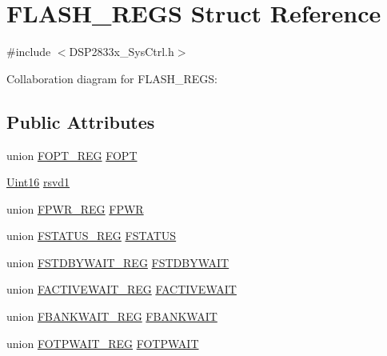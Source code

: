 \hypertarget{struct_f_l_a_s_h___r_e_g_s}{}\section{F\+L\+A\+S\+H\+\_\+\+R\+E\+G\+S Struct Reference}
\label{struct_f_l_a_s_h___r_e_g_s}


{\ttfamily \#include $<$D\+S\+P2833x\+\_\+\+Sys\+Ctrl.\+h$>$}



Collaboration diagram for F\+L\+A\+S\+H\+\_\+\+R\+E\+G\+S\+:
\subsection*{Public Attributes}
\begin{DoxyCompactItemize}
\item 
union \hyperlink{union_f_o_p_t___r_e_g}{F\+O\+P\+T\+\_\+\+R\+E\+G} \hyperlink{struct_f_l_a_s_h___r_e_g_s_a4e3737164105da516d12cf96d72e4462}{F\+O\+P\+T}
\item 
\hyperlink{_d_s_p2833x___device_8h_a59a9f6be4562c327cbfb4f7e8e18f08b}{Uint16} \hyperlink{struct_f_l_a_s_h___r_e_g_s_a908f202dcf45f912317192cf9217cc37}{rsvd1}
\item 
union \hyperlink{union_f_p_w_r___r_e_g}{F\+P\+W\+R\+\_\+\+R\+E\+G} \hyperlink{struct_f_l_a_s_h___r_e_g_s_a08947a9a22155823234bd3697acfa82c}{F\+P\+W\+R}
\item 
union \hyperlink{union_f_s_t_a_t_u_s___r_e_g}{F\+S\+T\+A\+T\+U\+S\+\_\+\+R\+E\+G} \hyperlink{struct_f_l_a_s_h___r_e_g_s_a6cab5a44e4b47f9a71c97561a6fd904b}{F\+S\+T\+A\+T\+U\+S}
\item 
union \hyperlink{union_f_s_t_d_b_y_w_a_i_t___r_e_g}{F\+S\+T\+D\+B\+Y\+W\+A\+I\+T\+\_\+\+R\+E\+G} \hyperlink{struct_f_l_a_s_h___r_e_g_s_ac70507eabc1bf0e5539c4add4b93aed9}{F\+S\+T\+D\+B\+Y\+W\+A\+I\+T}
\item 
union \hyperlink{union_f_a_c_t_i_v_e_w_a_i_t___r_e_g}{F\+A\+C\+T\+I\+V\+E\+W\+A\+I\+T\+\_\+\+R\+E\+G} \hyperlink{struct_f_l_a_s_h___r_e_g_s_a40e915f21d965b80013e0001d1b1c655}{F\+A\+C\+T\+I\+V\+E\+W\+A\+I\+T}
\item 
union \hyperlink{union_f_b_a_n_k_w_a_i_t___r_e_g}{F\+B\+A\+N\+K\+W\+A\+I\+T\+\_\+\+R\+E\+G} \hyperlink{struct_f_l_a_s_h___r_e_g_s_a02edad7918489475c25c28eba3cc2552}{F\+B\+A\+N\+K\+W\+A\+I\+T}
\item 
union \hyperlink{union_f_o_t_p_w_a_i_t___r_e_g}{F\+O\+T\+P\+W\+A\+I\+T\+\_\+\+R\+E\+G} \hyperlink{struct_f_l_a_s_h___r_e_g_s_ab19b5708a0955d8ed65a2e534ed1d9ea}{F\+O\+T\+P\+W\+A\+I\+T}
\end{DoxyCompactItemize}


